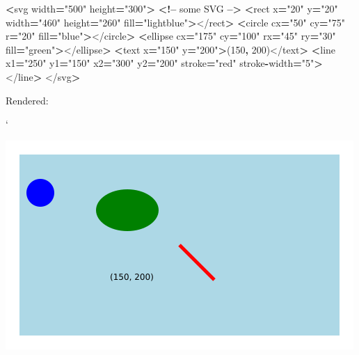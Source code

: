 \documentclass[openany]{book}
\newenvironment{Shaded}{\begin{snugshade}}{\end{snugshade}}
\newcommand{\DecValTok}[1]{\textcolor[rgb]{0.00,0.00,0.81}{#1}}
\newcommand{\NormalTok}[1]{#1}
\newcommand{\OperatorTok}[1]{\textcolor[rgb]{0.81,0.36,0.00}{\textbf{#1}}}
\newcommand{\StringTok}[1]{\textcolor[rgb]{0.31,0.60,0.02}{#1}}
\begin{document}
\begin{Shaded}
\begin{Highlighting}[]
\OperatorTok{<}\NormalTok{svg width}\OperatorTok{=}\StringTok{"500"}\NormalTok{ height}\OperatorTok{=}\StringTok{"300"}\OperatorTok{>}  \OperatorTok{<!--}\NormalTok{ some SVG }\OperatorTok{-->}
    \OperatorTok{<}\NormalTok{rect x}\OperatorTok{=}\StringTok{"20"}\NormalTok{ y}\OperatorTok{=}\StringTok{"20"}\NormalTok{ width}\OperatorTok{=}\StringTok{"460"}\NormalTok{ height}\OperatorTok{=}\StringTok{"260"}\NormalTok{ fill}\OperatorTok{=}\StringTok{"lightblue"}\OperatorTok{>}\NormalTok{</rect}\OperatorTok{>}
    \OperatorTok{<}\NormalTok{circle cx}\OperatorTok{=}\StringTok{"50"}\NormalTok{ cy}\OperatorTok{=}\StringTok{"75"}\NormalTok{ r}\OperatorTok{=}\StringTok{"20"}\NormalTok{ fill}\OperatorTok{=}\StringTok{"blue"}\OperatorTok{>}\NormalTok{</circle}\OperatorTok{>}
    \OperatorTok{<}\NormalTok{ellipse cx}\OperatorTok{=}\StringTok{"175"}\NormalTok{ cy}\OperatorTok{=}\StringTok{"100"}\NormalTok{ rx}\OperatorTok{=}\StringTok{"45"}\NormalTok{ ry}\OperatorTok{=}\StringTok{"30"}\NormalTok{ fill}\OperatorTok{=}\StringTok{"green"}\OperatorTok{>}\NormalTok{</ellipse}\OperatorTok{>}
    \OperatorTok{<}\NormalTok{text x}\OperatorTok{=}\StringTok{"150"}\NormalTok{ y}\OperatorTok{=}\StringTok{"200"}\OperatorTok{>}\NormalTok{(}\DecValTok{150}\OperatorTok{,} \DecValTok{200}\NormalTok{)</text}\OperatorTok{>}
    \OperatorTok{<}\NormalTok{line x1}\OperatorTok{=}\StringTok{"250"}\NormalTok{ y1}\OperatorTok{=}\StringTok{"150"}\NormalTok{ x2}\OperatorTok{=}\StringTok{"300"}\NormalTok{ y2}\OperatorTok{=}\StringTok{"200"}\NormalTok{ stroke}\OperatorTok{=}\StringTok{"red"}\NormalTok{ stroke}\OperatorTok{-}\NormalTok{width}\OperatorTok{=}\StringTok{"5"}\OperatorTok{>}\NormalTok{</line}\OperatorTok{>}
\NormalTok{</svg}\OperatorTok{>}
\end{Highlighting}
\end{Shaded}

Rendered:

`

\begin{center}\includegraphics[width=0.5\linewidth]{images/shapessvg} \end{center}
\end{document}
